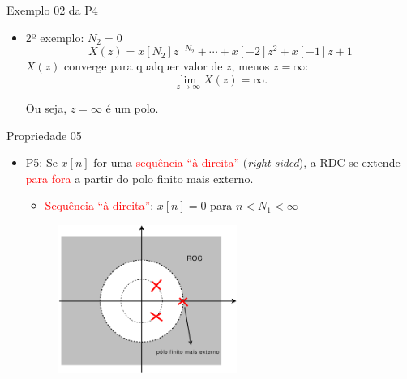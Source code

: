 \begin{slide}{Exemplo 02 da P4}
   \begin{itemize}
      \item 2º exemplo: $N_2=0$ \begin{equation*}X(z) = x[N_2]z^{-N_2}+ \cdots +x[-2]z^{2}+x[-1]z+1\end{equation*}
    $X(z)$ converge para qualquer valor de $z$, menos $z=\infty$:
   \begin{equation*}
      \lim_{z\rightarrow\infty}X(z) = \infty.
   \end{equation*} 
   
   Ou seja, $z=\infty$ é um polo.
   \end{itemize} 
\end{slide}

\begin{slide}{Propriedade 05}
\begin{itemize}
   \item P5: Se $x[n]$ for uma \textcolor{red}{sequência ``à direita''} (\emph{right-sided}), a RDC se extende \textcolor{red}{para fora} a partir do polo finito mais externo.
   \begin{itemize}
      \item \textcolor{red}{Sequência ``à direita''}: $x[n]=0$ para $ n<N_1<\infty $
   \end{itemize}
   \begin{figure}
      \centering
      \includegraphics[width=0.55\textwidth]{figs/p5.eps}
   \end{figure}
\end{itemize}
\end{slide}

